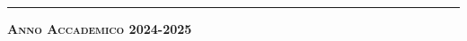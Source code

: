 \begin{titlepage}
\begin{center}
\begin{tabular}{lcl}
\end{tabular}

\vspace{12mm}

\rule{150mm}{.2mm}

\textbf{\scshape Anno Accademico 2024-2025}
\end{center} 	
\end{titlepage}

